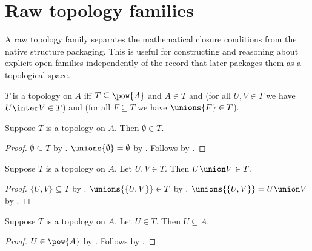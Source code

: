 



\section{Raw topology families}

A raw topology family separates the mathematical closure conditions from the
native structure packaging. This is useful for constructing and reasoning
about explicit open families independently of the record that later packages
them as a topological space.

\begin{definition}\label{topology_family}
    $T$ is a topology on $A$ iff
        $T\subseteq\pow{A}$ and
        $A\in T$ and
        (for all $U,V\in T$ we have $U\inter V\in T$) and
        (for all $F\subseteq T$ we have $\unions{F}\in T$).
\end{definition}

\begin{proposition}\label{topology_family_empty}
    Suppose $T$ is a topology on $A$.
    Then $\emptyset\in T$.
\end{proposition}
\begin{proof}
    $\emptyset\subseteq T$ by .
    $\unions{\emptyset}=\emptyset$ by .
    Follows by .
\end{proof}

\begin{proposition}\label{topology_family_binary_union}
    Suppose $T$ is a topology on $A$.
    Let $U,V\in T$.
    Then $U\union V\in T$.
\end{proposition}
\begin{proof}
    $\{U,V\}\subseteq T$ by .
    $\unions{\{U,V\}}\in T$ by .
    $\unions{\{U,V\}}=U\union V$ by .
\end{proof}

\begin{proposition}\label{topology_family_members_subset_carrier}
    Suppose $T$ is a topology on $A$.
    Let $U\in T$.
    Then $U\subseteq A$.
\end{proposition}
\begin{proof}
    $U\in\pow{A}$ by .
    Follows by .
\end{proof}
